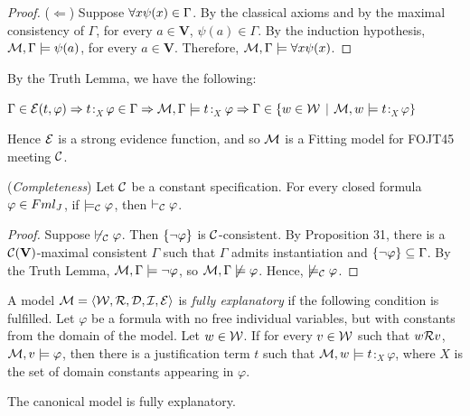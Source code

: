 \begin{proof}
	
	\qquad ($\Leftarrow$) Suppose  $\forall x \psi(x) \in \Gamma$. By the classical axioms and by the maximal consistency of $\Gamma$, for every $a \in \textbf{V}$,  $\psi(a) \in \Gamma$. By the induction hypothesis, $\mathcal{M}, \Gamma \models \psi(a)$, for every $a \in \textbf{V}$. Therefore,  $\mathcal{M}, \Gamma \models \forall x \psi(x)$.  
\end{proof}

\qquad By the Truth Lemma, we have the following:


\begin{center}
	$\Gamma \in \mathcal{E}(t,\varphi) \Rightarrow t$$:_{X}$$\varphi \in \Gamma \Rightarrow \mathcal{M},\Gamma \models t$$:_{X}$$\varphi \Rightarrow \Gamma \in \{w \in \mathcal{W}$ $|$ $ \mathcal{M},w \models t$$:_{X}$$\varphi\}$
\end{center}

Hence $\mathcal{E}$ is a strong evidence function, and so $\mathcal{M}$ is a Fitting model for FOJT45 meeting $\mathcal{C}$.

\begin{teor}
	(\textit{Completeness}) Let $\mathcal{C}$ be a constant specification. For every closed formula $\varphi \in Fml_{J}$, if $\models_{\mathcal{C}} \varphi$, then $\vdash_{\mathcal{C}}\varphi$.
\end{teor}

\begin{proof}
	Suppose $\not\vdash_{\mathcal{C}}\varphi$. Then $\{\neg \varphi\}$ is $\mathcal{C}$-consistent. By Proposition 31, there is a $\mathcal{C}(\textbf{V})$-maximal consistent $\Gamma$ such that $\Gamma$ admits instantiation and  $\{\neg \varphi\} \subseteq \Gamma$. By the Truth Lemma, $\mathcal{M},\Gamma \models \neg \varphi$, so  $\mathcal{M},\Gamma \not\models \varphi$. Hence, $\not\models_{\mathcal{C}} \varphi$.     
\end{proof}




\begin{defn}
	A model $\mathcal{M} = \langle\mathcal{W},\mathcal{R},\mathcal{D},\mathcal{I},\mathcal{E} \rangle$ is \textit{fully explanatory} if the following condition is fulfilled. Let $\varphi$ be a formula with no free individual variables, but with constants from the domain of the model. Let $w \in \mathcal{W}$. If for every $v \in \mathcal{W}$ such that $w\mathcal{R} v$, $\mathcal{M}, v \models \varphi$, then there is a justification term $t$ such that $\mathcal{M}, w \models t$$:_{X}$$\varphi$, where $X$ is the set of
	domain constants appearing in $\varphi$. 
\end{defn}


\begin{teor}
	The canonical model is fully explanatory.
\end{teor}


